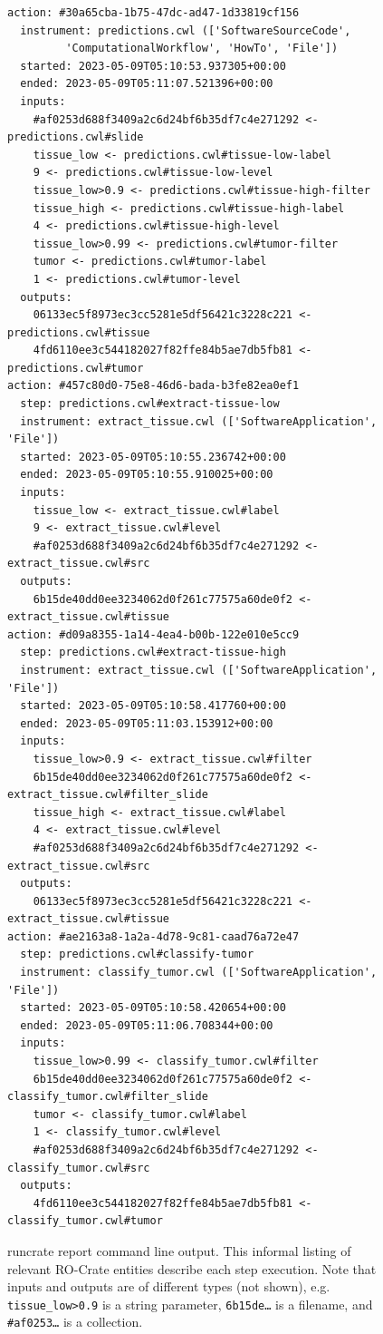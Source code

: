 \begin{figure}
\label{ch54:lst:ml_pipeline_streamflow_report}
\begin{footnotesize}
\begin{verbatim}
action: #30a65cba-1b75-47dc-ad47-1d33819cf156
  instrument: predictions.cwl (['SoftwareSourceCode', 
         'ComputationalWorkflow', 'HowTo', 'File'])
  started: 2023-05-09T05:10:53.937305+00:00
  ended: 2023-05-09T05:11:07.521396+00:00
  inputs:
    #af0253d688f3409a2c6d24bf6b35df7c4e271292 <- predictions.cwl#slide
    tissue_low <- predictions.cwl#tissue-low-label
    9 <- predictions.cwl#tissue-low-level
    tissue_low>0.9 <- predictions.cwl#tissue-high-filter
    tissue_high <- predictions.cwl#tissue-high-label
    4 <- predictions.cwl#tissue-high-level
    tissue_low>0.99 <- predictions.cwl#tumor-filter
    tumor <- predictions.cwl#tumor-label
    1 <- predictions.cwl#tumor-level
  outputs:
    06133ec5f8973ec3cc5281e5df56421c3228c221 <- predictions.cwl#tissue
    4fd6110ee3c544182027f82ffe84b5ae7db5fb81 <- predictions.cwl#tumor
action: #457c80d0-75e8-46d6-bada-b3fe82ea0ef1
  step: predictions.cwl#extract-tissue-low
  instrument: extract_tissue.cwl (['SoftwareApplication', 'File'])
  started: 2023-05-09T05:10:55.236742+00:00
  ended: 2023-05-09T05:10:55.910025+00:00
  inputs:
    tissue_low <- extract_tissue.cwl#label
    9 <- extract_tissue.cwl#level
    #af0253d688f3409a2c6d24bf6b35df7c4e271292 <- extract_tissue.cwl#src
  outputs:
    6b15de40dd0ee3234062d0f261c77575a60de0f2 <- extract_tissue.cwl#tissue
action: #d09a8355-1a14-4ea4-b00b-122e010e5cc9
  step: predictions.cwl#extract-tissue-high
  instrument: extract_tissue.cwl (['SoftwareApplication', 'File'])
  started: 2023-05-09T05:10:58.417760+00:00
  ended: 2023-05-09T05:11:03.153912+00:00
  inputs:
    tissue_low>0.9 <- extract_tissue.cwl#filter
    6b15de40dd0ee3234062d0f261c77575a60de0f2 <- extract_tissue.cwl#filter_slide
    tissue_high <- extract_tissue.cwl#label
    4 <- extract_tissue.cwl#level
    #af0253d688f3409a2c6d24bf6b35df7c4e271292 <- extract_tissue.cwl#src
  outputs:
    06133ec5f8973ec3cc5281e5df56421c3228c221 <- extract_tissue.cwl#tissue
action: #ae2163a8-1a2a-4d78-9c81-caad76a72e47
  step: predictions.cwl#classify-tumor
  instrument: classify_tumor.cwl (['SoftwareApplication', 'File'])
  started: 2023-05-09T05:10:58.420654+00:00
  ended: 2023-05-09T05:11:06.708344+00:00
  inputs:
    tissue_low>0.99 <- classify_tumor.cwl#filter
    6b15de40dd0ee3234062d0f261c77575a60de0f2 <- classify_tumor.cwl#filter_slide
    tumor <- classify_tumor.cwl#label
    1 <- classify_tumor.cwl#level
    #af0253d688f3409a2c6d24bf6b35df7c4e271292 <- classify_tumor.cwl#src
  outputs:
    4fd6110ee3c544182027f82ffe84b5ae7db5fb81 <- classify_tumor.cwl#tumor
\end{verbatim}
\caption{runcrate report command line output. This informal listing of relevant RO-Crate entities describe each step execution. Note that inputs and outputs are of different types (not shown), e.g. \texttt{tissue\_low>0.9} is a string parameter, \texttt{6b15de…} is a filename, and \texttt{\#af0253…} is a collection.}
\end{footnotesize}


\end{figure}
